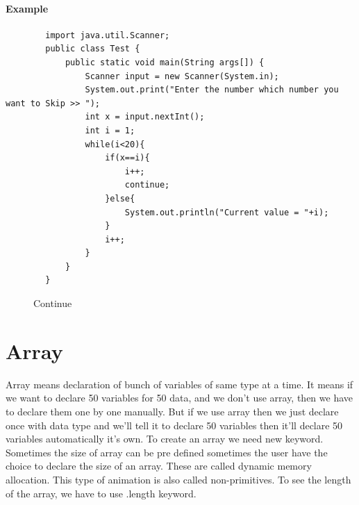 \documentclass[openany]{book}  %
\begin{document}
\subsubsection{Example}
\begin{center}
    \begin{verbatim}
        import java.util.Scanner;
        public class Test {
            public static void main(String args[]) {
                Scanner input = new Scanner(System.in);
                System.out.print("Enter the number which number you want to Skip >> ");
                int x = input.nextInt();
                int i = 1;
                while(i<20){
                    if(x==i){
                        i++;
                        continue;
                    }else{
                        System.out.println("Current value = "+i);
                    }
                    i++;
                }
            }
        }
    \end{verbatim}
\end{center}
% 
% 
\begin{figure}[htbp]
    \begin{center}
        \caption{Continue}
    \end{center}
\end{figure}


% 
% 
\chapter{Array}
Array means declaration of bunch of variables of same type at a time.
It means if we want to declare 50 variables for 50 data, and we don't
use array, then we have to declare them one by one manually. But if we
use array then we just declare once with data type and we'll tell
it to declare 50 variables then it'll declare 50 variables automatically
it's own. \linebreak
To create an array we need new keyword. Sometimes the size of array
can be pre defined sometimes the user have the choice to declare the
size of an array. These are called dynamic memory allocation. This
type of animation is also called non-primitives. \linebreak
To see the length of the array, we have to use .length keyword.
% 
%  
\end{document}
